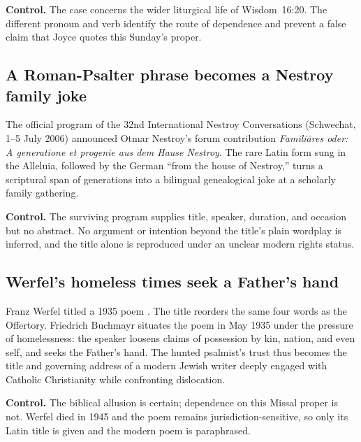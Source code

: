 \textbf{Control.} The case concerns the wider liturgical life of Wisdom~16:20.
The different pronoun and verb identify the route of dependence and prevent a
false claim that Joyce quotes this Sunday's proper.

\subsection*{A Roman-Psalter phrase becomes a Nestroy family joke\enspace{}}

The official program of the 32nd International Nestroy Conversations
(Schwechat, 1--5 July 2006) announced Otmar Nestroy's forum contribution
\emph{Familiäres oder: A generatione et progenie aus dem Hause Nestroy}.
The rare Latin form sung in the Alleluia, followed by the German ``from the
house of Nestroy,'' turns a scriptural span of generations into a bilingual
genealogical joke at a scholarly family gathering.

\textbf{Control.} The surviving program supplies title, speaker, duration,
and occasion but no abstract. No argument or intention beyond the title's
plain wordplay is inferred, and the title alone is reproduced under an
unclear modern rights status.

\subsection*{Werfel's homeless times seek a Father's hand\enspace{}}

Franz Werfel titled a 1935 poem . The title
reorders the same four words as the Offertory. Friedrich Buchmayr situates the
poem in May 1935 under the pressure of homelessness: the speaker loosens claims
of possession by kin, nation, and even self, and seeks the Father's hand.
The hunted psalmist's trust thus becomes the title and governing address of a
modern Jewish writer deeply engaged with Catholic Christianity while
confronting dislocation.

\textbf{Control.} The biblical allusion is certain; dependence on this Missal
proper is not. Werfel died in 1945 and the poem remains jurisdiction-sensitive,
so only its Latin title is given and the modern poem is paraphrased.
